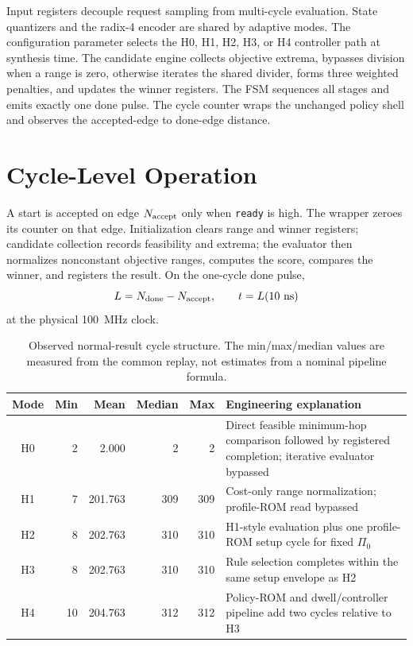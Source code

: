 Input registers decouple request sampling from multi-cycle evaluation. State
quantizers and the radix-4 encoder are shared by adaptive modes. The configuration
parameter selects the H0, H1, H2, H3, or H4 controller path at synthesis time. The
candidate engine collects objective extrema, bypasses division when a range is zero,
otherwise iterates the shared divider, forms three weighted penalties, and updates
the winner registers. The FSM sequences all stages and emits exactly one done pulse.
The cycle counter wraps the unchanged policy shell and observes the accepted-edge to
done-edge distance.

\section{Cycle-Level Operation}

A start is accepted on edge $N_{\rm accept}$ only when \texttt{ready} is high. The
wrapper zeroes its counter on that edge. Initialization clears range and winner
registers; candidate collection records feasibility and extrema; the evaluator then
normalizes nonconstant objective ranges, computes the score, compares the winner,
and registers the result. On the one-cycle done pulse,
\begin{equation}
L=N_{\rm done}-N_{\rm accept},\qquad t=L(10~\mathrm{ns})
\label{eq:latency}
\end{equation}
at the physical 100~MHz clock.

\begin{table}[H]
\centering
\small
\caption{Observed normal-result cycle structure. The min/max/median values are
measured from the common replay, not estimates from a nominal pipeline formula.}
\label{tab:cycle-operation}
\begin{tabularx}{\textwidth}{@{}c rrrr X@{}}
\toprule
\textbf{Mode} & \textbf{Min} & \textbf{Mean} & \textbf{Median} & \textbf{Max} &
\textbf{Engineering explanation}\\
\midrule
H0 & 2 & 2.000 & 2 & 2 & Direct feasible minimum-hop comparison followed by
registered completion; iterative evaluator bypassed\\
H1 & 7 & 201.763 & 309 & 309 & Cost-only range normalization; profile-ROM
read bypassed\\
H2 & 8 & 202.763 & 310 & 310 & H1-style evaluation plus one profile-ROM
setup cycle for fixed $\Pi_0$\\
H3 & 8 & 202.763 & 310 & 310 & Rule selection completes within the same
setup envelope as H2\\
H4 & 10 & 204.763 & 312 & 312 & Policy-ROM and dwell/controller pipeline add
two cycles relative to H3\\
\bottomrule
\end{tabularx}
\end{table}


